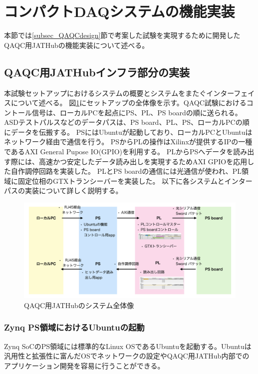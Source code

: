 \section{コンパクトDAQシステムの機能実装}
本節では\ref{subsec_QAQCdesign}節で考案した試験を実現するために開発したQAQC用JATHubの機能実装について述べる。

\subsection{QAQC用JATHubインフラ部分の実装}
\label{subsec_infra}
本試験セットアップにおけるシステムの概要とシステムをまたぐインターフェイスについて述べる。
図\ref{JAThubinfra}にセットアップの全体像を示す。QAQC試験におけるコントール信号は、ローカルPCを起点にPS、PL、PS boardの順に送られる。
ASDテストパルスなどのデータパスは、PS board、PL、PS、ローカルPCの順にデータを伝搬する。
PSにはUbuntuが起動しており、ローカルPCとUbuntuはネットワーク経由で通信を行う。
PSからPLの操作はXilinxが提供するIPの一種であるAXI General Pupose IO(GPIO)を利用する。
PLからPSへデータを読み出す際には、高速かつ安定したデータ読み出しを実現するためAXI GPIOを応用した自作調停回路を実装した。
PLとPS boardの通信には光通信が使われ、PL領域に固定位相のGTXトランシーバーを実装した。
以下に各システムとインターパスの実装について詳しく説明する。

\begin{figure} 
\centering
\includegraphics[width=16cm]{fig/QAQC/JAThubinfra.png}
\caption[QAQC用JATHubのシステム全体像]{QAQC用JATHubのシステム全体像}
\label{JAThubinfra}
\end{figure}

\subsubsection{Zynq PS領域におけるUbuntuの起動}
\label{subsubsec_ubuntu}
\baselineskip
Zynq SoCのPS領域には標準的なLinux OSであるUbuntuを起動する。Ubuntuは汎用性と拡張性に富んだOSでネットワークの設定やQAQC用JATHub内部でのアプリケーション開発を容易に行うことができる。\par

